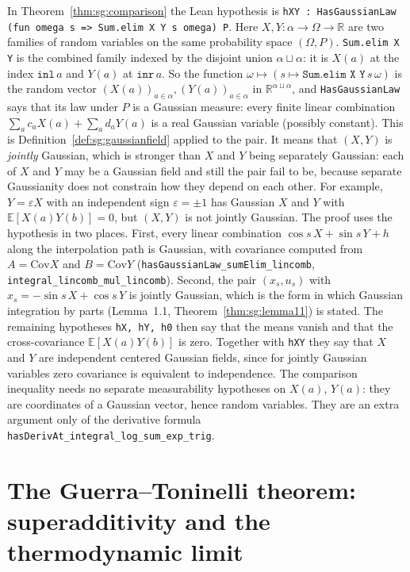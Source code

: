 \begin{remark}\label{rem:sg:hxy}
In Theorem~\ref{thm:sg:comparison} the Lean hypothesis is
\texttt{hXY : HasGaussianLaw (fun omega s => Sum.elim X Y s omega) P}. Here $X,Y:\alpha\to\Omega\to\mathbb R$ are two families of random
variables on the same probability space $(\Omega,P)$. \texttt{Sum.elim X Y} is the combined family indexed by the disjoint union
$\alpha\sqcup\alpha$: it is $X(a)$ at the index $\texttt{inl}\,a$ and $Y(a)$ at $\texttt{inr}\,a$. So the function
$\omega\mapsto(s\mapsto\texttt{Sum.elim X Y}\,s\,\omega)$ is the random vector $(X(a))_{a\in\alpha},(Y(a))_{a\in\alpha}$ in $\mathbb R^{\alpha\sqcup\alpha}$,
and \texttt{HasGaussianLaw} says that its law under $P$ is a Gaussian measure: every finite linear combination
$\sum_ac_aX(a)+\sum_ad_aY(a)$ is a real Gaussian variable (possibly constant). This is Definition~\ref{def:sg:gaussianfield} applied to the pair.
It means that $(X,Y)$ is \emph{jointly} Gaussian, which is stronger than $X$ and $Y$ being separately Gaussian: each of
$X$ and $Y$ may be a Gaussian field and still the pair fail to be, because separate Gaussianity does not constrain how they depend on
each other. For example, $Y=\varepsilon X$ with an independent sign $\varepsilon=\pm1$ has Gaussian $X$ and $Y$ with $\mathbb E[X(a)Y(b)]=0$, but $(X,Y)$ is not jointly Gaussian.
The proof uses the hypothesis in two places. First, every linear combination $\cos s\,X+\sin s\,Y+h$ along the interpolation path is
Gaussian, with covariance computed from $A=\mathrm{Cov}X$ and $B=\mathrm{Cov}Y$ (\texttt{hasGaussianLaw\_sumElim\_lincomb},
\texttt{integral\_lincomb\_mul\_lincomb}). Second, the pair $(x_s,u_s)$ with $x_s=-\sin s\,X+\cos s\,Y$ is jointly Gaussian, which is the form in which Gaussian integration by
parts (Lemma~1.1, Theorem~\ref{thm:sg:lemma11}) is stated. The remaining hypotheses \texttt{hX, hY, h0} then say that the means vanish and that the cross-covariance
$\mathbb E[X(a)Y(b)]$ is zero. Together with \texttt{hXY} they say that $X$ and $Y$ are independent centered Gaussian fields, since for jointly Gaussian
variables zero covariance is equivalent to independence. The comparison inequality needs no separate measurability hypotheses on $X(a)$, $Y(a)$: they are coordinates of a Gaussian vector, hence random variables.
They are an extra argument only of the derivative formula \texttt{hasDerivAt\_integral\_log\_sum\_exp\_trig}.
\end{remark}

\section{The Guerra--Toninelli theorem: superadditivity and the thermodynamic limit}\label{sec:sg:gt}

